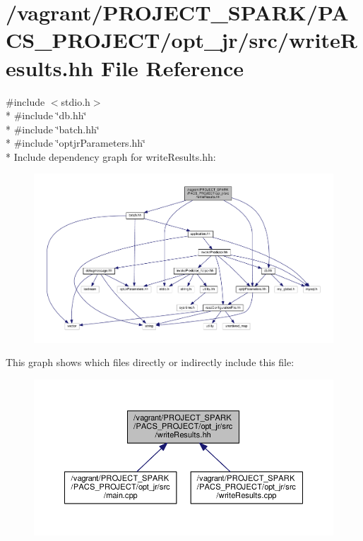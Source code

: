 \hypertarget{writeResults_8hh}{\section{/vagrant/\-P\-R\-O\-J\-E\-C\-T\-\_\-\-S\-P\-A\-R\-K/\-P\-A\-C\-S\-\_\-\-P\-R\-O\-J\-E\-C\-T/opt\-\_\-jr/src/write\-Results.hh File Reference}
\label{writeResults_8hh}
}
{\ttfamily \#include $<$stdio.\-h$>$}\\*
{\ttfamily \#include \char`\"{}db.\-hh\char`\"{}}\\*
{\ttfamily \#include \char`\"{}batch.\-hh\char`\"{}}\\*
{\ttfamily \#include \char`\"{}optjr\-Parameters.\-hh\char`\"{}}\\*
Include dependency graph for write\-Results.\-hh\-:\nopagebreak
\begin{figure}[H]
\begin{center}
\leavevmode
\includegraphics[width=350pt]{writeResults_8hh__incl}
\end{center}
\end{figure}
This graph shows which files directly or indirectly include this file\-:\nopagebreak
\begin{figure}[H]
\begin{center}
\leavevmode
\includegraphics[width=350pt]{writeResults_8hh__dep__incl}
\end{center}
\end{figure}
